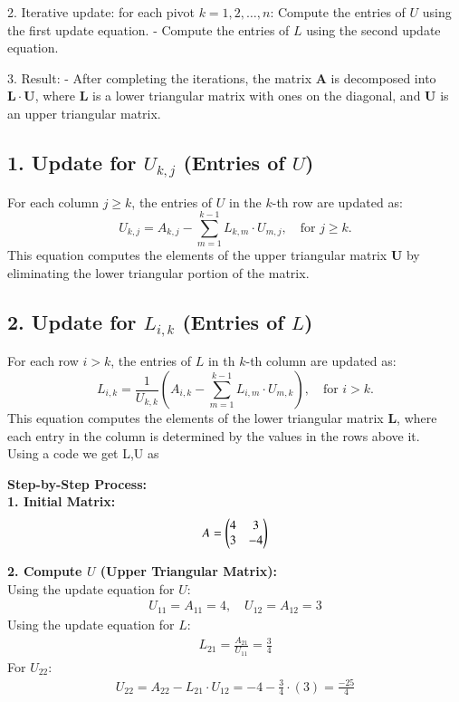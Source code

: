 \documentclass[journal]{IEEEtran}
\begin{document}
2. Iterative update: for each pivot $ k = 1, 2, \ldots, n $: Compute the entries of $ U $ using the first update equation.
     - Compute the entries of $ L $ using the second update equation.
   
3. Result:
   - After completing the iterations, the matrix $ \mathbf{A} $ is decomposed into $ \mathbf{L} \cdot \mathbf{U} $, where $ \mathbf{L} $ is a lower triangular matrix with ones on the diagonal, and $ \mathbf{U} $ is an upper triangular matrix.
\subsection*{1. Update for $ U_{k,j} $ (Entries of $ U $)}

For each column $ j \geq k $, the entries of $ U $ in the $ k $-th row are updated as:
\[
U_{k,j} = A_{k,j} - \sum_{m=1}^{k-1} L_{k,m} \cdot U_{m,j}, \quad \text{for } j \geq k.
\]
This equation computes the elements of the upper triangular matrix $ \mathbf{U} $ by eliminating the lower triangular portion of the matrix.

\subsection*{2. Update for $ L_{i,k} $ (Entries of $ L $)}

For each row $ i > k $, the entries of $ L $ in th $ k $-th column are updated as:
\[
L_{i,k} = \frac{1}{U_{k,k}} \left( A_{i,k} - \sum_{m=1}^{k-1} L_{i,m} \cdot U_{m,k} \right), \quad \text{for } i > k.
\]
This equation computes the elements of the lower triangular matrix $ \mathbf{L} $, where each entry in the column is determined by the values in the rows above it.\\
Using a code we get L,U as 

\textbf{Step-by-Step Process:}\\

\textbf{1. Initial Matrix:}
\begin{align}
    A = \begin{pmatrix}4&3\\3&-4\end{pmatrix}
\end{align}

\textbf{2. Compute $U$ (Upper Triangular Matrix):}\\
Using the update equation for $U$:
\begin{align}
    U_{11} = A_{11} = 4, \quad U_{12} = A_{12} = 3
\end{align}
Using the update equation for $L$:
\begin{align}
    L_{21} = \frac{A_{21}}{U_{11}} = \frac{3}{4}
\end{align}
For $U_{22}$:
\begin{align}
    U_{22} = A_{22} - L_{21} \cdot U_{12} = -4 - \frac{3}{4} \cdot (3) = \frac{-25}{4}
\end{align}
\end{document}
